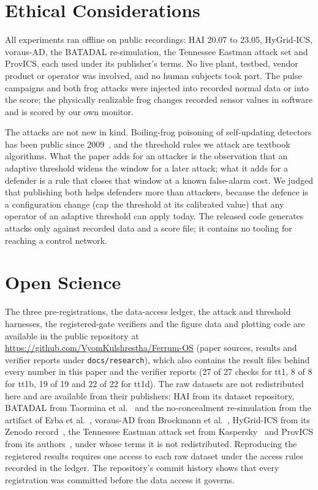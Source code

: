 \documentclass[sigconf]{acmart}
\begin{document}



\appendix

\section*{Ethical Considerations}

All experiments ran offline on public recordings: HAI 20.07 to 23.05, HyGrid-ICS, voraus-AD, the
BATADAL re-simulation, the Tennessee Eastman attack set and ProvICS, each used under its publisher's
terms. No live plant, testbed, vendor product
or operator was involved, and no human subjects took part. The pulse campaigns and both frog attacks
were injected into recorded normal data or into the score; the physically realizable frog changes
recorded sensor values in software and is scored by our own monitor.

The attacks are not new in kind. Boiling-frog poisoning of self-updating detectors has been public
since 2009~\cite{chantin2009frog, rubinstein2009antidote}, and the threshold rules we attack are
textbook algorithms. What the paper adds for an attacker is the observation that an adaptive
threshold widens the window for a later attack; what it adds for a defender is a rule that closes
that window at a known false-alarm cost. We judged that publishing both helps defenders more than
attackers, because the defence is a configuration change (cap the threshold at its calibrated value)
that any operator of an adaptive threshold can apply today. The released code generates attacks only
against recorded data and a score file; it contains no tooling for reaching a control network.

\section*{Open Science}

The three pre-registrations, the data-access ledger, the attack and threshold harnesses, the
registered-gate verifiers and the figure data and plotting code are available in the public repository at
\url{https://github.com/VyomKulshrestha/Ferrum-OS} (paper sources, results and verifier reports
under \texttt{docs/research}), which also contains the result files behind
every number in this paper and the verifier reports (27 of 27 checks for tt1, 8 of 8 for tt1b, 19 of 19
and 22 of 22 for tt1d).
The raw datasets are not redistributed here and are available from their publishers: HAI from its
dataset repository, BATADAL from Taormina et al.~\cite{taormina2018batadal} and the no-concealment
re-simulation from the artifact of Erba et al.~\cite{erba2020concealment}, voraus-AD from Brockmann
et al.~\cite{brockmann2024voraus}, HyGrid-ICS from its Zenodo record~\cite{yolcu2026hygrid}, the
Tennessee Eastman attack set from Kaspersky~\cite{filonov2017tep} and ProvICS from its
authors~\cite{shibbir2026provics}, under whose terms it is not redistributed.
Reproducing the registered results requires one access to each raw dataset under the access rules
recorded in the ledger. The repository's commit history shows that every registration was committed before
the data access it governs.
\end{document}
